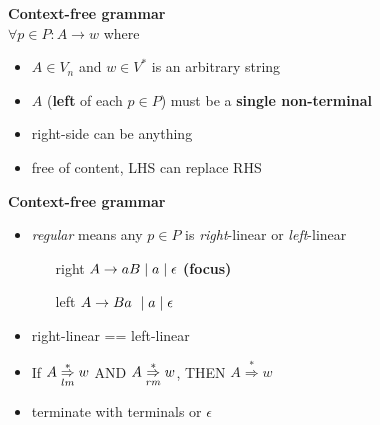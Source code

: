 \begin{minipage}[t]{0.5\linewidth}
  \textbf{Context-free grammar}\\
\(\forall p \in P: A \rightarrow w\) where
\begin{itemize}
\item \(A \in V_{n}\) and \(w \in V^{*}\) is an arbitrary string
\item \(A\) (\textbf{left} of each \(p \in P\)) must be a \textbf{single non-terminal}
\item right-side can be anything
\item free of content, LHS can replace RHS
\end{itemize}
\end{minipage}
\begin{minipage}[t]{0.5\linewidth}
  \textbf{Context-free grammar}
\begin{itemize}
\item \emph{regular} means any \(p \in P\) is \emph{right}-linear or \emph{left}-linear
  \begin{itemize}[leftmargin=3em]
  \item[right] \(A \rightarrow aB \;|\; a \;|\; \epsilon\) \textbf{(focus)}
  \item[left] \(A \rightarrow Ba\ \;|\; a \;|\; \epsilon\)
  \end{itemize}
\item right-linear == left-linear
\item If \(A \overset{*}{\underset{lm}{\Rightarrow}} w\) AND \(A \overset{*}{\underset{rm}{\Rightarrow}} w\), THEN \(A \overset{*}{\Rightarrow} w\)
\item terminate with terminals or \(\epsilon\)
\end{itemize}
\end{minipage}
